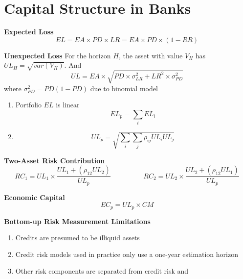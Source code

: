 \documentclass[11pt,fleqn]{book} %
\numberwithin{equation}{section} %
\numberwithin{figure}{section} %
\numberwithin{table}{section} %
\begin{document}
\chapter{Capital Structure in Banks}
\begin{definition}\textbf{Expected Loss}
$$
EL=EA\times PD\times LR=EA\times PD\times (1-RR)
$$
\end{definition}
\begin{definition}\textbf{Unexpected Loss}
For the horizon $H$, the asset with value $V_H$ has $UL_{H}=\sqrt{var(V_H)}$. And
$$
UL=EA\times\sqrt{PD\times\sigma_{LR}^2+LR^2\times\sigma_{PD}^2}
$$
where $\sigma_{PD}^2=PD(1-PD)$ due to binomial model
\end{definition}
\begin{definition}
\begin{enumerate}
    \item Portfolio $EL$ is linear
    $$
    EL_p=\sum_{i}EL_i
    $$
    \item 
    $$
    UL_p=\sqrt{\sum_{i}\sum_{j}\rho_{ij}UL_{i}UL_{j}}
    $$
\end{enumerate}
\end{definition}
\begin{definition}\textbf{Two-Asset Risk Contribution}
$$
RC_1=UL_1\times\frac{UL_1+(\rho_{12}UL_2)}{UL_p}\hspace{2cm}RC_2=UL_2\times\frac{UL_2+(\rho_{12}UL_1)}{UL_p}
$$
\end{definition}
\begin{definition}\textbf{Economic Capital}
$$
EC_p=UL_p\times CM
$$
\end{definition}
\begin{remark}\textbf{Bottom-up Risk Measurement Limitations}
\begin{enumerate}
    \item Credits are presumed to be illiquid assets
    \item Credit risk models used in practice only use a one-year estimation horizon
    \item Other risk components are separated from credit risk and
\end{enumerate}
\end{remark}
\end{document}
